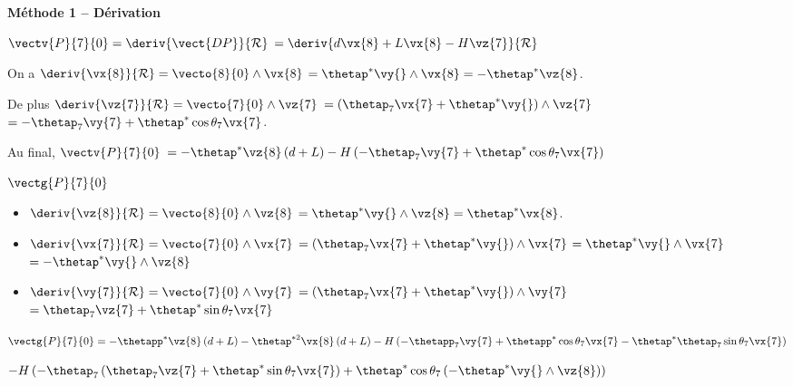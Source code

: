 \ifprof
\begin{corrige}
\textbf{Méthode 1 -- Dérivation}

$\vectv{P}{7}{0} = \deriv{\vect{DP}}{\mathcal{R}}$ 
$= \deriv{d\vx{8}+L\vx{8}-H\vz{7}}{\mathcal{R}}$

On  a
$\deriv{\vx{8}}{\mathcal{R}} = \vecto{8}{0}\wedge\vx{8} $ $=\thetap^* \vy{}\wedge\vx{8} = -\thetap^* \vz{8}$.

De plus $\deriv{\vz{7}}{\mathcal{R}} = \vecto{7}{0}\wedge\vz{7} $ 
$=\left(\thetap_7 \vx{7}+ \thetap^* \vy{}\right)\wedge\vz{7}$
$=-\thetap_7 \vy{7}+ \thetap^*  \cos \theta_7 \vx{7}$.

Au final,
$\vectv{P}{7}{0} $
$= -\thetap^* \vz{8} \left(d+L\right)    -H  \left(-\thetap_7 \vy{7}+ \thetap^*  \cos \theta_7 \vx{7} \right)$

\end{corrige}
\else
\fi

\ifprof
\begin{corrige}
$\vectg{P}{7}{0} $


\begin{itemize}
\item $\deriv{\vz{8}}{\mathcal{R}} = \vecto{8}{0}\wedge\vz{8} $ $=\thetap^* \vy{}\wedge\vz{8} = \thetap^* \vx{8}$.
\item $\deriv{\vx{7}}{\mathcal{R}} = \vecto{7}{0}\wedge\vx{7} $ 
$=\left(\thetap_7 \vx{7}+ \thetap^* \vy{}\right)\wedge\vx{7}$
$= \thetap^* \vy{}\wedge\vx{7}$
$= -\thetap^* \vy{}\wedge\vz{8}$
\item $\deriv{\vy{7}}{\mathcal{R}} = \vecto{7}{0}\wedge\vy{7} $ 
$=\left(\thetap_7 \vx{7}+ \thetap^* \vy{}\right)\wedge\vy{7}$
$=\thetap_7 \vz{7}+ \thetap^* \sin \theta_7 \vx{7}$
\end{itemize}

$\vectg{P}{7}{0} =  
-\thetapp^* \vz{8} \left(d+L\right)    
-\thetap^{*2} \vx{8} \left(d+L\right)    
-H  \left(-\thetapp_7 \vy{7}+ \thetapp^*  \cos \theta_7 \vx{7} - \thetap^*  \thetap_7 \sin \theta_7 \vx{7} \right)$

$-H  \left(-\thetap_7 \left(\thetap_7 \vz{7}+ \thetap^* \sin \theta_7 \vx{7} \right)+ \thetap^*  \cos \theta_7 \left( -\thetap^* \vy{}\wedge\vz{8}\right)\right) $
\end{corrige}
\else
\fi
